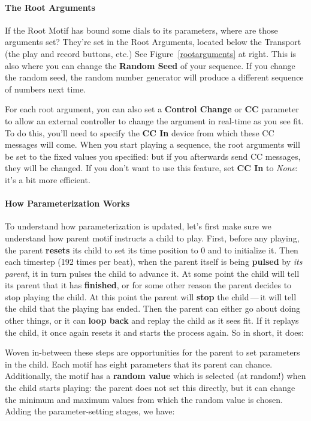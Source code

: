 \documentclass[twoside,10pt]{article}
\begin{document}
\paragraph{The Root Arguments}  If the Root Motif has bound some dials to its parameters, where are those arguments set?  They're set in the Root Arguments, located below the Transport (the play and record buttons, etc.)  See Figure~\ref{rootarguments} at right.  This is also where you can change the {\bf Random Seed} of your sequence.  If you change the random seed, the random number generator will produce a different sequence of numbers next time.

For each root argument, you can also set a {\bf Control Change} or {\bf CC} parameter to allow an external controller to change the argument in real-time as you see fit.  To do this, you'll need to specify the {\bf CC In} device from which these CC messages will come.  When you start playing a sequence, the root arguments will be set to the fixed values you specified: but if you afterwards send CC messages, they will be changed.  If you don't want to use this feature, set  {\bf CC In} to {\it None}: it's a bit more efficient.

\paragraph{How Parameterization Works}
To understand how parameterization is updated, let's first make sure we understand how  parent motif instructs a child to play.  First, before any playing, the parent {\bf resets} its child to set its time position to 0 and to initialize it.  Then each timestep (192 times per beat), when the parent itself is being {\bf pulsed} by {\it its parent}, it in turn pulses the child to advance it.  At some point the child will tell its parent that it has {\bf finished}, or for some other reason the parent decides to stop playing the child.  At this point the parent will {\bf stop} the child\,---\,it will tell the child that the playing has ended.  Then the parent can either go about doing other things, or it can {\bf loop back} and replay the child as it sees fit.  If it replays the child, it once again resets it and starts the process again.  So in short, it does:

Woven in-between these steps are opportunities for the parent to set parameters in the child.    Each motif has eight parameters that its parent can chance.  Additionally, the motif has a {\bf random value} which is selected (at random!) when the child starts playing: the parent does not set this directly, but it can change the minimum and maximum values from which the random value is chosen.  Adding the parameter-setting stages, we have: 
\end{document}
